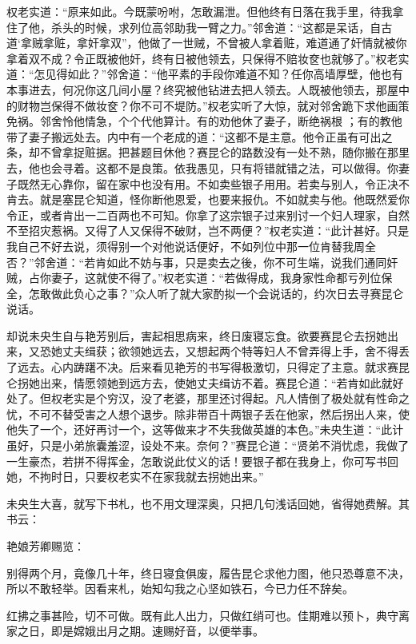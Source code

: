 \documentclass[a4paper,12pt,UTF8,twoside]{ctexbook}
\begin{document}
权老实道：“原来如此。今既蒙吩咐，怎敢漏泄。但他终有日落在我手里，待我拿住了他，杀头的时候，求列位高邻助我一臂之力。”邻舍道：“这都是呆话，自古道‘拿贼拿赃，拿奸拿双”，他做了一世贼，不曾被人拿着赃，难道通了奸情就被你拿着双不成？令正既被他奸，终有日被他领去，只保得不赔妆奁也就够了。”权老实道：“怎见得如此？”邻舍道：“他平素的手段你难道不知？任你高墙厚壁，他也有本事进去，何况你这几间小屋？终究被他钻进去把人领去。人既被他领去，那屋中的财物岂保得不做妆奁？你不可不堤防。”权老实听了大惊，就对邻舍跪下求他画策免祸。邻舍怜他情急，个个代他算计。有的劝他休了妻子，断绝祸根 ；有的教他带了妻子搬远处去。内中有一个老成的道：“这都不是主意。他令正虽有可出之条，却不曾拿捉赃据。把甚题目休他？赛昆仑的路数没有一处不熟，随你搬在那里去，他也会寻着。这都不是良策。依我愚见，只有将错就错之法，可以做得。你妻子既然无心靠你，留在家中也没有用。不如卖些银子用用。若卖与别人，令正决不肯去。就是塞昆仑知道，怪你断他恩爱，也要来报仇。不如就卖与他。他既然爱你令正，或者肯出一二百两也不可知。你拿了这宗银子过来别讨一个妇人理家，自然不至招灾惹祸。又得了人又保得不破财，岂不两便？”权老实道：“此计甚好。只是我自己不好去说，须得别一个对他说话便好，不如列位中那一位肯替我周全否？”邻舍道：“若肯如此不妨与事，只是卖去之後，你不可生端，说我们通同奸贼，占你妻子，这就使不得了。”权老实道：“若做得成，我身家性命都亏列位保全，怎敢做此负心之事？”众人听了就大家酌拟一个会说话的，约次日去寻赛昆仑说话。

却说未央生自与艳芳别后，害起相思病来，终日废寝忘食。欲要赛昆仑去拐她出来，又恐她丈夫缉获；欲领她远去，又想起两个特等妇人不曾弄得上手，舍不得丢了远去。心内踌躇不决。后来看见艳芳的书写得极激切，只得定了主意。就求赛昆仑拐她出来，情愿领她到远方去，使她丈夫缉访不着。赛昆仑道：“若肯如此就好处了。但权老实是个穷汉，没了老婆，那里还讨得起。凡人情倒了极处就有性命之忧，不可不替受害之人想个退步。除非带百十两银子丢在他家，然后拐出人来，使他失了一个，还好再讨一个，这等做来才不失我做英雄的本色。”未央生道：“此计虽好，只是小弟旅囊羞涩，设处不来。奈何？”赛昆仑道：“贤弟不消忧虑，我做了一生豪杰，若拼不得挥金，怎敢说此仗义的话！要银子都在我身上，你可写书回她，不拘时日，只要权老实不在家我就去拐她出来。”

未央生大喜，就写下书札，也不用文理深奥，只把几句浅话回她，省得她费解。其书云：

艳娘芳卿赐览：

别得两个月，竟像几十年，终日寝食俱废，履告昆仑求他力图，他只恐尊意不决，所以不敢轻举。因看来札，始知勾我之心坚如铁石，今已力任不辞矣。

红拂之事甚险，切不可做。既有此人出力，只做红绡可也。佳期难以预卜，典守离家之日，即是嫦娥出月之期。速赐好音，以便举事。
\end{document}
